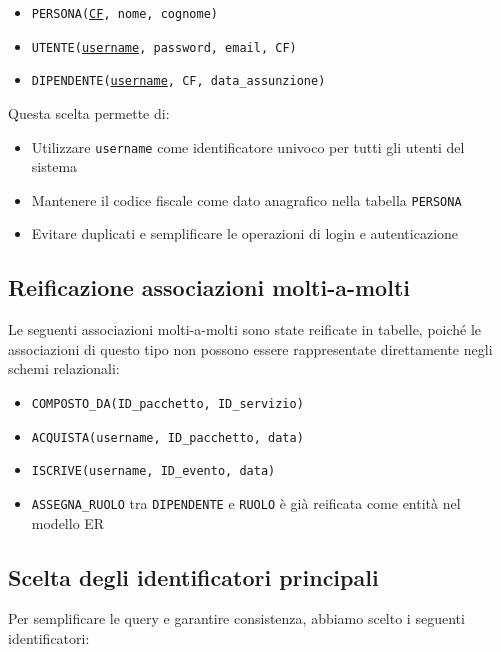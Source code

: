\documentclass[a4paper,12pt]{report}
\begin{document}
\begin{itemize}
	\item \texttt{PERSONA(\underline{CF}, nome, cognome)}
	\item \texttt{UTENTE(\underline{username}, password, email, CF)}
	\item \texttt{DIPENDENTE(\underline{username}, CF, data\_assunzione)}
\end{itemize} 
\vspace{\baselineskip}
Questa scelta permette di:
\begin{itemize}
	\item Utilizzare \texttt{username} come identificatore univoco per tutti gli utenti del sistema
	\item Mantenere il codice fiscale come dato anagrafico nella tabella \texttt{PERSONA}
	\item Evitare duplicati e semplificare le operazioni di login e autenticazione
\end{itemize}

\subsection{Reificazione associazioni molti-a-molti}

Le seguenti associazioni molti-a-molti sono state reificate in tabelle, poiché le associazioni di 
questo tipo non possono essere rappresentate direttamente negli schemi relazionali:

\begin{itemize}
	\item \texttt{COMPOSTO\_DA(ID\_pacchetto, ID\_servizio)}
	\item \texttt{ACQUISTA(username, ID\_pacchetto, data)}
	\item \texttt{ISCRIVE(username, ID\_evento, data)}
	\item \texttt{ASSEGNA\_RUOLO} tra \texttt{DIPENDENTE} e \texttt{RUOLO} è già reificata come entità nel modello ER
\end{itemize}

\subsection{Scelta degli identificatori principali}
Per semplificare le query e garantire consistenza, abbiamo scelto i seguenti identificatori:
\end{document}
